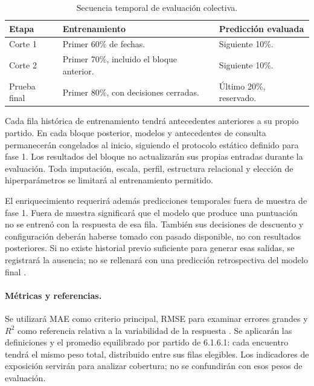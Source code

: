 \begin{table}[htbp]
\centering\small
\caption{Secuencia temporal de evaluación colectiva.}
\begin{tabularx}{\textwidth}{@{}p{2.1cm}XX@{}}
\toprule
\textbf{Etapa}&\textbf{Entrenamiento}&\textbf{Predicción evaluada}\\\midrule
Corte 1 & Primer 60\% de fechas. & Siguiente 10\%.\\
Corte 2 & Primer 70\%, incluido el bloque anterior. & Siguiente 10\%.\\
Prueba final & Primer 80\%, con decisiones cerradas. & Último 20\%, reservado.\\
\bottomrule
\end{tabularx}
\end{table}

Cada fila histórica de entrenamiento tendrá antecedentes anteriores a su propio partido. En cada bloque posterior, modelos y antecedentes de consulta permanecerán congelados al inicio, siguiendo el protocolo estático definido para fase 1. Los resultados del bloque no actualizarán sus propias entradas durante la evaluación. Toda imputación, escala, perfil, estructura relacional y elección de hiperparámetros se limitará al entrenamiento permitido.

El enriquecimiento requerirá además predicciones temporales fuera de muestra de fase 1. Fuera de muestra significará que el modelo que produce una puntuación no se entrenó con la respuesta de esa fila. También sus decisiones de descuento y configuración deberán haberse tomado con pasado disponible, no con resultados posteriores. Si no existe historial previo suficiente para generar esas salidas, se registrará la ausencia; no se rellenará con una predicción retrospectiva del modelo final \cite{sklearnCommonPitfallsPonderacion,cawley2010selection}.

\paragraph*{Métricas y referencias.}
Se utilizará MAE como criterio principal, RMSE para examinar errores grandes y $R^2$ como referencia relativa a la variabilidad de la respuesta \cite{sklearnMetricas6161}. Se aplicarán las definiciones y el promedio equilibrado por partido de 6.1.6.1: cada encuentro tendrá el mismo peso total, distribuido entre sus filas elegibles. Los indicadores de exposición servirán para analizar cobertura; no se confundirán con esos pesos de evaluación.

